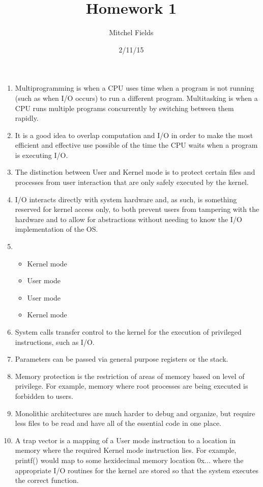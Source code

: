 \documentclass{article}
\begin{document}
\title{Homework 1}
\author{Mitchel Fields}
\date{2/11/15}
\maketitle

\begin{enumerate}
	\item Multiprogramming is when a CPU uses time when a program is not running (such as when I/O occurs) to run a different program. Multitasking is when a CPU runs multiple programs concurrently by switching between them rapidly.
	\item It is a good idea to overlap computation and I/O in order to make the most efficient and effective use possible of the time the CPU waits when a program is executing I/O.
	\item The distinction between User and Kernel mode is to protect certain files and processes from user interaction that are only safely executed by the kernel.
	\item I/O interacts directly with system hardware and, as such, is something reserved for kernel access only, to both prevent users from tampering with the hardware and to allow for abstractions without needing to know the I/O implementation of the OS.
	\item \begin{itemize}
		\item Kernel mode
		\item User mode
		\item User mode
		\item Kernel mode
	\end{itemize}
	\item System calls transfer control to the kernel for the execution of privileged instructions, such as I/O.
	\item Parameters can be passed via general purpose registers or the stack.
	\item Memory protection is the restriction of areas of memory based on level of privilege. For example, memory where root processes are being executed is forbidden to users.
	\item Monolithic architectures are much harder to debug and organize, but require less files to be read and have all of the essential code in one place.
	\item A trap vector is a mapping of a User mode instruction to a location in memory where the required Kernel mode instruction lies. For example, printf() would map to some hexidecimal memory location 0x... where the appropriate I/O routines for the kernel are stored so that the system executes the correct function.
\end{enumerate}
	
\end{document}
